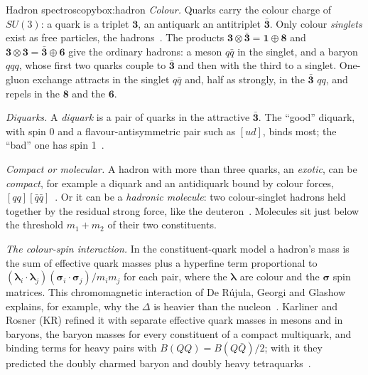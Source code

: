 \begin{primer}{Hadron spectroscopy}{box:hadron}
\setlength{\parskip}{3pt plus 1pt}%
\emph{Colour.} Quarks carry the colour charge of $SU(3)$: a quark is a triplet $\mathbf3$, an antiquark an antitriplet $\mathbf{\bar3}$.
Only colour \emph{singlets} exist as free particles, the hadrons~\cite{navas2024}. The products
$\mathbf3\otimes\mathbf{\bar3}=\mathbf1\oplus\mathbf8$ and $\mathbf3\otimes\mathbf3=\mathbf{\bar3}\oplus\mathbf6$ give the ordinary
hadrons: a meson $q\bar q$ in the singlet, and a baryon $qqq$, whose first two quarks couple to $\mathbf{\bar3}$ and then with the third to
a singlet. One-gluon exchange attracts in the singlet $q\bar q$ and, half as strongly, in the $\mathbf{\bar3}$ $qq$, and repels in the
$\mathbf8$ and the $\mathbf6$.

\emph{Diquarks.} A \emph{diquark} is a pair of quarks in the attractive $\mathbf{\bar3}$. The ``good'' diquark, with spin 0 and a
flavour-antisymmetric pair such as $[ud]$, binds most; the ``bad'' one has spin 1~\cite{jaffe2005}.

\emph{Compact or molecular.} A hadron with more than three quarks, an \emph{exotic}, can be \emph{compact}, for example a diquark and an
antidiquark bound by colour forces, $[qq][\bar q\bar q]$~\cite{maiani2005}. Or it can be a \emph{hadronic molecule}: two colour-singlet
hadrons held together by the residual strong force, like the deuteron~\cite{guo2018}. Molecules sit just below the threshold
$m_1+m_2$ of their two constituents.

\emph{The colour-spin interaction.} In the constituent-quark model a hadron's mass is the sum of effective quark masses plus a hyperfine
term proportional to $(\boldsymbol\lambda_i\cdot\boldsymbol\lambda_j)(\boldsymbol\sigma_i\cdot\boldsymbol\sigma_j)/m_im_j$ for each pair,
where the $\boldsymbol\lambda$ are colour and the $\boldsymbol\sigma$ spin matrices. This chromomagnetic interaction of De R\'ujula, Georgi
and Glashow explains, for example, why the $\Delta$ is heavier than the nucleon~\cite{derujula1975}. Karliner and Rosner (KR) refined it
with separate effective quark masses in mesons and in baryons, the baryon masses for every constituent of a compact multiquark, and binding
terms for heavy pairs with $B(QQ)=B(Q\bar Q)/2$; with it they predicted the doubly charmed baryon and doubly heavy
tetraquarks~\cite{karliner2014,karliner2017}.


\end{primer}
